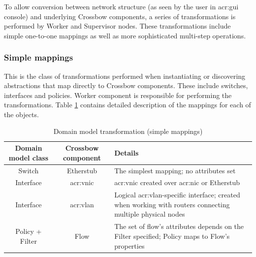 \documentclass[11pt,openany]{book}
\begin{document}
        To allow conversion between network structure (as seen by the user in \gls{acr:gui} console) and underlying
        Crossbow components, a series of transformations is performed by Worker and Supervisor nodes. These
        transformations include simple one-to-one mappings as well as more sophisticated multi-step operations.


        \subsubsection{Simple mappings}

          This is the class of transformations performed when instantiating or discovering abstractions that map
          directly to Crossbow components. These include switches, interfaces and policies. Worker component is
          responsible for performing the transformations. Table \ref{tab:impl:simple-mapping} contains detailed
          description of the mappings for each of the objects.

          \begin{table}[H]
            \centering

            \begin{tabularx}{\textwidth}{|c|c|X|}
              \hline
              Domain model class & Crossbow component & \centering Details                                              \tabularnewline
              \hline \hline
              Switch             & Etherstub          & The simplest mapping; no attributes set                         \\
              \hline
              Interface          & \gls{acr:vnic}     & \gls{acr:vnic} created over \gls{acr:nic} or Etherstub          \\
              \hline
              Interface          & \gls{acr:vlan}     & Logical \gls{acr:vlan}-specific interface; created when working
                                                        with routers connecting multiple physical nodes                 \\
              \hline
              Policy + Filter    & Flow               & The set of flow's attributes depends on the Filter specified;
                                                        Policy maps to Flow's properties                                \\
              \hline
            \end{tabularx}

            \caption{Domain model transformation (simple mappings)}
            \label{tab:impl:simple-mapping}
          \end{table}
\end{document}
